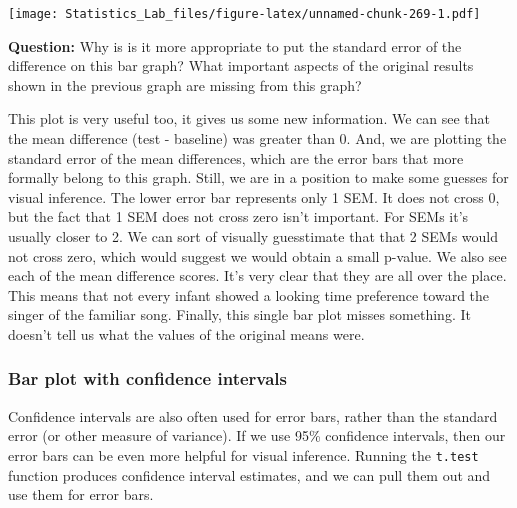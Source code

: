 \documentclass[
]{book}
\begin{document}
\texttt{[image: Statistics\_Lab\_files/figure-latex/unnamed-chunk-269-1.pdf]}

\textbf{Question:} Why is is it more appropriate to put the standard error of the difference on this bar graph? What important aspects of the original results shown in the previous graph are missing from this graph?

This plot is very useful too, it gives us some new information. We can see that the mean difference (test - baseline) was greater than 0. And, we are plotting the standard error of the mean differences, which are the error bars that more formally belong to this graph. Still, we are in a position to make some guesses for visual inference. The lower error bar represents only 1 SEM. It does not cross 0, but the fact that 1 SEM does not cross zero isn't important. For SEMs it's usually closer to 2. We can sort of visually guesstimate that that 2 SEMs would not cross zero, which would suggest we would obtain a small p-value. We also see each of the mean difference scores. It's very clear that they are all over the place. This means that not every infant showed a looking time preference toward the singer of the familiar song. Finally, this single bar plot misses something. It doesn't tell us what the values of the original means were.

\hypertarget{bar-plot-with-confidence-intervals}{%
\subsubsection{Bar plot with confidence intervals}\label{bar-plot-with-confidence-intervals}}

Confidence intervals are also often used for error bars, rather than the standard error (or other measure of variance). If we use 95\% confidence intervals, then our error bars can be even more helpful for visual inference. Running the \texttt{t.test} function produces confidence interval estimates, and we can pull them out and use them for error bars.
\end{document}
